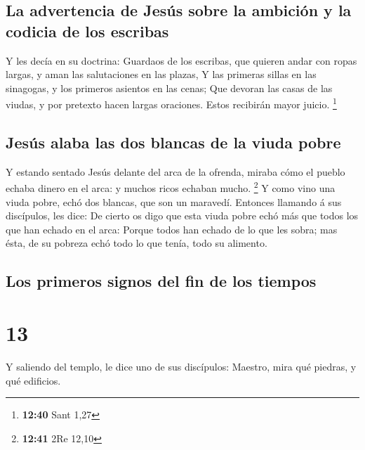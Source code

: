 \hypertarget{la-advertencia-de-jesuxfas-sobre-la-ambiciuxf3n-y-la-codicia-de-los-escribas}{%
\subsection{La advertencia de Jesús sobre la ambición y la codicia de
los
escribas}\label{la-advertencia-de-jesuxfas-sobre-la-ambiciuxf3n-y-la-codicia-de-los-escribas}}

 Y les decía en su doctrina: Guardaos de los escribas,
que quieren andar con ropas largas, y aman las salutaciones en las
plazas,  Y las primeras sillas en las sinagogas, y los
primeros asientos en las cenas;  Que devoran las casas de
las viudas, y por pretexto hacen largas oraciones. Estos recibirán mayor
juicio. \footnote{\textbf{12:40} Sant 1,27}

\hypertarget{jesuxfas-alaba-las-dos-blancas-de-la-viuda-pobre}{%
\subsection{Jesús alaba las dos blancas de la viuda
pobre}\label{jesuxfas-alaba-las-dos-blancas-de-la-viuda-pobre}}

 Y estando sentado Jesús delante del arca de la ofrenda,
miraba cómo el pueblo echaba dinero en el arca: y muchos ricos echaban
mucho. \footnote{\textbf{12:41} 2Re 12,10}  Y como vino
una viuda pobre, echó dos blancas, que son un maravedí. 
Entonces llamando á sus discípulos, les dice: De cierto os digo que esta
viuda pobre echó más que todos los que han echado en el arca:
 Porque todos han echado de lo que les sobra; mas ésta,
de su pobreza echó todo lo que tenía, todo su alimento.

\hypertarget{los-primeros-signos-del-fin-de-los-tiempos}{%
\subsection{Los primeros signos del fin de los
tiempos}\label{los-primeros-signos-del-fin-de-los-tiempos}}

\hypertarget{section-12}{%
\section{13}\label{section-12}}

 Y saliendo del templo, le dice uno de sus discípulos:
Maestro, mira qué piedras, y qué edificios.

